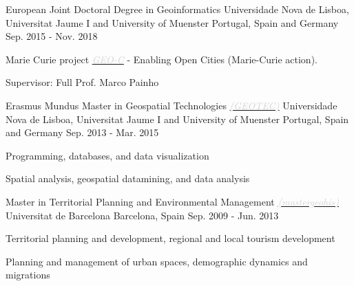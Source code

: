 

\begin{cventries}

  \cventry
    {European Joint Doctoral Degree in Geoinformatics} %
    {Universidade Nova de Lisboa, Universitat Jaume I and University of Muenster } %
    {Portugal, Spain and Germany} %
    {Sep. 2015 - Nov. 2018} %
    { 
        \begin{cvitems} %
            \item {Marie Curie project \href{www.geo-c.eu}{\textit{\textcolor{lightgray}{GEO-C}}} - Enabling Open Cities (Marie-Curie action).}
            \item {Supervisor: Full Prof. Marco Painho}
        \end{cvitems}
     }
    

  \cventry
    {Erasmus Mundus Master in Geospatial Technologies \href{http://mastergeotech.info}{\textit{\textcolor{lightgray}{(GEOTEC)}}}} %
    {Universidade Nova de Lisboa, Universitat Jaume I and University of Muenster} %
    {Portugal, Spain and Germany} %
    {Sep. 2013 - Mar. 2015}
    {
        \begin{cvitems} %
            \item {Programming, databases, and data visualization}
            \item {Spatial analysis, geospatial datamining, and data analysis}
        \end{cvitems}
    }


  \cventry
    {Master in Territorial Planning and Environmental Management \href{http://mastergeotech.info}{\textit{\textcolor{lightgray}{(mastergeohis)}}}} %
    {Universitat de Barcelona} %
    {Barcelona, Spain} %
    {Sep. 2009 - Jun. 2013}
    {
        \begin{cvitems} %
            \item {Territorial planning and development, regional and local tourism development}
            \item {Planning and management of urban spaces, demographic dynamics and migrations}
        \end{cvitems}
    }


\end{cventries}
